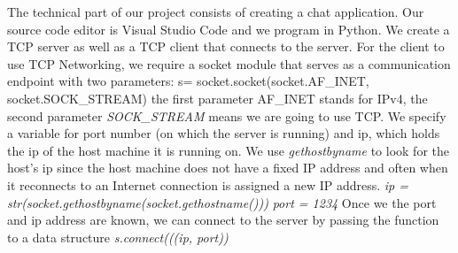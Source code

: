 The technical part of our project consists of creating a chat application. Our source code editor is Visual Studio Code and we program in Python. We create a TCP server as well as a TCP client that connects to the server. 
For the client to use TCP Networking, we require a socket module that serves as a communication endpoint with two parameters:
s= socket.socket(socket.AF\_INET, socket.SOCK\_STREAM)
the first parameter AF\_INET stands for IPv4, the second parameter \textit{SOCK\_STREAM} means we are going to use TCP. We specify a variable for port number (on which the server is running) and ip, which holds the ip of the host machine it is running on. We use \textit{gethostbyname} to look for the host’s ip since the host machine does not have a fixed IP address and often when it reconnects to an Internet connection is assigned a new IP address.
\textit{ip = str(socket.gethostbyname(socket.gethostname()))}
\textit{port = 1234}
Once we the port and ip address are known, we can connect to the server by passing the function to a data structure \textit{s.connect(((ip, port))}

